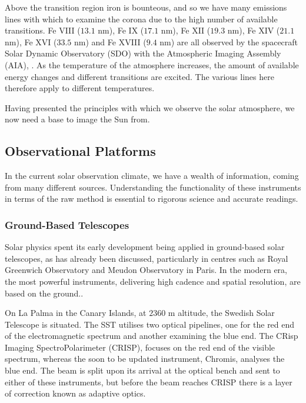 
Above the transition region iron is bounteous, and so we have many emissions lines with which to examine the corona due to the high number of available transitions.
Fe VIII ($13.1$ nm), Fe IX ($17.1$ nm), Fe XII ($19.3$ nm), Fe XIV ($21.1$ nm), Fe XVI ($33.5$ nm) and Fe XVIII ($9.4$ nm) are all observed by the spacecraft Solar Dynamic Observatory (SDO) with the Atmospheric Imaging Assembly (AIA), \cite{Schmelz2013}.
As the temperature of the atmosphere increases, the amount of available energy changes and different transitions are excited.
The various lines here therefore apply to different temperatures.

Having presented the principles with which we observe the solar atmosphere, we now need a base to image the Sun from.

\subsection{Observational Platforms }

In the current solar observation climate, we have a wealth of information, coming from many different sources.
Understanding the functionality of these instruments in terms of the raw method is essential to rigorous science and accurate readings.

\subsubsection{Ground-Based Telescopes}
\label{sec:ground}
Solar physics spent its early development being applied in ground-based solar telescopes, as has already been discussed, particularly in centres such as Royal Greenwich Observatory and Meudon Observatory in Paris.
In the modern era, the most powerful instruments, delivering high cadence and spatial resolution, are based on the ground..

On La Palma in the Canary Islands, at $2360$ m altitude, the Swedish Solar Telescope is situated.
The SST utilises two optical pipelines, one for the red end of the electromagnetic spectrum and another examining the blue end.
The CRisp Imaging SpectroPolarimeter (CRISP), focuses on the red end of the visible spectrum, whereas the soon to be updated instrument, Chromis, analyses the blue end.
The beam is split upon its arrival at the optical bench and sent to either of these instruments, but before the beam reaches CRISP there is a layer of correction known as adaptive optics.

